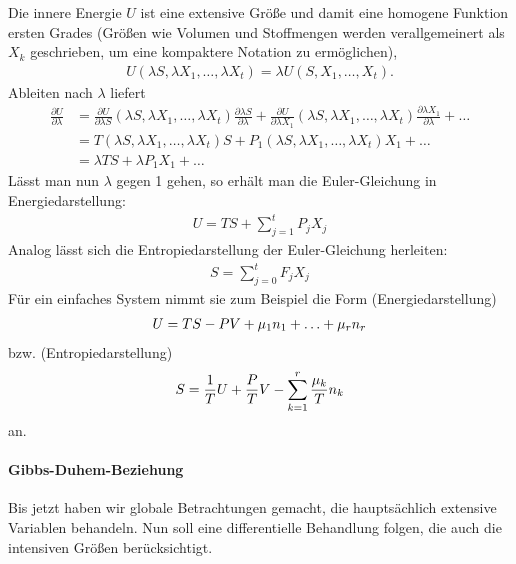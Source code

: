Die innere Energie $U$ ist eine extensive Größe und damit eine homogene Funktion ersten Grades (Größen wie Volumen und Stoffmengen werden verallgemeinert als $X_k$ geschrieben, um eine kompaktere Notation zu ermöglichen),
\begin{align*}
    U(\lambda S,\lambda X_1,\ldots,\lambda X_t) = \lambda U(S,X_1,\ldots,X_t).
\end{align*}
Ableiten nach $\lambda$ liefert
\begin{align*}
    \frac{\partial U}{\partial\lambda} & = \frac{\partial U}{\partial\lambda S}(\lambda S,\lambda X_1,\ldots,\lambda X_t) \frac{\partial\lambda S}{\partial\lambda} + \frac{\partial U}{\partial\lambda X_1}(\lambda S,\lambda X_1,\ldots,\lambda X_t) \frac{\partial\lambda X_1}{\partial\lambda} + \ldots \\
                                       & = T(\lambda S,\lambda X_1,\ldots,\lambda X_t)S + P_1 (\lambda S,\lambda X_1,\ldots,\lambda X_t) X_1 + \ldots                                                                                                                                                       \\
                                       & = \lambda TS + \lambda P_1X_1 + \ldots
\end{align*}
Lässt man nun $\lambda$ gegen 1 gehen, so erhält man die Euler-Gleichung in Energiedarstellung:
\begin{align}
    \label{eq:euler_gleichung_energiedarstellung}
    \boxed{U = TS + \sum_{j=1}^t P_j X_j}
\end{align}
Analog lässt sich die Entropiedarstellung der Euler-Gleichung herleiten:
\begin{align}
    \label{eq:euler_gleichung_entropiedarstellung}
    \boxed{S = \sum_{j=0}^t F_j X_j}
\end{align}
Für ein einfaches System nimmt sie zum Beispiel die Form (Energiedarstellung)
\begin{align*}
    U=TS-PV + \mu_1 n_1+\ldots + \mu_r n_r
\end{align*}
bzw. (Entropiedarstellung)
\begin{align*}
    S=\frac{1}{T}U + \frac{P}{T}V - \sum_{k=1}^r \frac{\mu_k}{T}n_k
\end{align*}
an.


\paragraph*{Gibbs-Duhem-Beziehung}

Bis jetzt haben wir globale Betrachtungen gemacht, die hauptsächlich extensive Variablen behandeln. Nun soll eine differentielle Behandlung folgen, die auch die intensiven Größen berücksichtigt.

